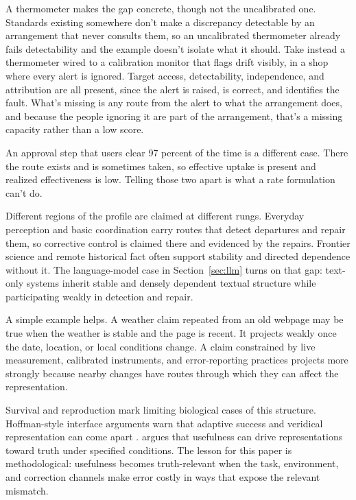 \documentclass[12pt]{article}
\begin{document}
A thermometer makes the gap concrete, though not the uncalibrated one. Standards existing
somewhere don't make a discrepancy detectable by an arrangement that never consults them, so
an uncalibrated thermometer already fails detectability and the example doesn't isolate what
it should. Take instead a thermometer wired to a calibration monitor that flags drift
visibly, in a shop where every alert is ignored. Target access, detectability, independence,
and attribution are all present, since the alert is raised, is correct, and identifies the
fault. What's missing is any route from the alert to what the arrangement does, and because
the people ignoring it are part of the arrangement, that's a missing capacity rather than a
low score.

An approval step that users clear 97 percent of the time is a different case. There the
route exists and is sometimes taken, so effective uptake is present and realized
effectiveness is low. Telling those two apart is what a rate formulation can't do.

Different regions of the profile are claimed at different rungs. Everyday perception and
basic coordination carry routes that detect departures and repair them, so corrective
control is claimed there and evidenced by the repairs. Frontier science and remote
historical fact often support stability and directed dependence without it. The
language-model case in Section~\ref{sec:llm} turns on that gap: text-only systems inherit
stable and densely dependent textual structure while participating weakly in detection
and repair.

A simple example helps. A weather claim repeated from an old webpage may be true when
the weather is stable and the page is recent. It projects weakly once the date, location,
or local conditions change. A claim constrained by live measurement, calibrated
instruments, and error-reporting practices projects more strongly because nearby
changes have routes through which they can affect the representation.

Survival and reproduction mark limiting biological cases of this structure. Hoffman-style
interface arguments warn that adaptive success and veridical representation can come apart
\citep{hoffman_singh_prakash_2015_interface_theory_perception}. \textcite{martinez_2019_usefulness_drives_representations_truth}
argues that usefulness can drive representations toward truth under specified
conditions. The lesson for this paper is methodological: usefulness becomes
truth-relevant when the task, environment, and
correction channels make error costly in ways that expose the relevant mismatch.
\end{document}
